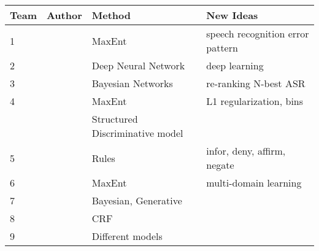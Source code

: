 \begin{tabular}{l|l|l|l}
Team&Author&Method&New Ideas\\\hline
1&\cite{Metallinou:2013}&MaxEnt&speech recognition error pattern\\
2&\cite{Henderson:2013}&Deep Neural Network&deep learning\\
3&\cite{Cuayahuitl:2013}&Bayesian Networks&re-ranking N-best ASR\\
4&\cite{Lee:2013a}&MaxEnt&L1 regularization, bins\\
&\cite{Lee:2013b}&Structured Discriminative model&\\
5&\cite{Wang:2013}&Rules&infor, deny, affirm, negate\\
6&\cite{Williams:2013b}&MaxEnt&multi-domain learning\\
7&\cite{Zilka:2013}&Bayesian, Generative&\\
8&\cite{Ren:2013}&CRF&\\
9&\cite{Kim:2013}&Different models&\\
\end{tabular}